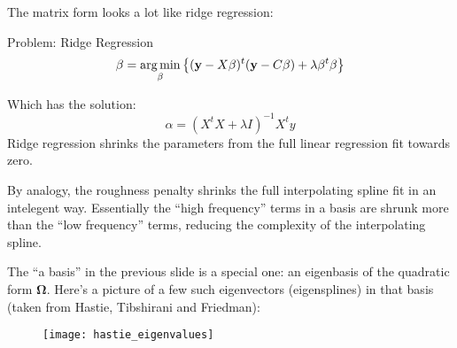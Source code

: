 %
%
\begin{frame}
  The matrix form looks a lot like ridge regression:
  \begin{block}{Problem: Ridge Regression}
    $$ \beta = \operatorname*{arg\,min}_{\beta} \left\{ (\mathbf{y} - X \beta)^t (\mathbf{y} - C \beta) + \lambda \beta^t \beta \right\} $$
 \end{block}
 Which has the solution:
 $$ \alpha = ( X^t X + \lambda I )^{-1} X^t y $$
 Ridge regression shrinks the parameters from the full linear regression fit towards zero.
\end{frame}
%
%
\begin{frame}
  By analogy, the roughness penalty shrinks the full interpolating spline fit in an intelegent way.  Essentially the ``high frequency'' terms in a basis are shrunk more than the ``low frequency'' terms, reducing the complexity of the interpolating spline.
\end{frame}
%
%
\begin{frame}
  The ``a basis'' in the previous slide is a special one: an eigenbasis of the quadratic form $\mathbf{\Omega}$.  Here's a picture of a few such eigenvectors (eigensplines) in that basis (taken from Hastie, Tibshirani and Friedman):
  \begin{figure}
    \texttt{[image: hastie\_eigenvalues]}
  \end{figure}
\end{frame}
